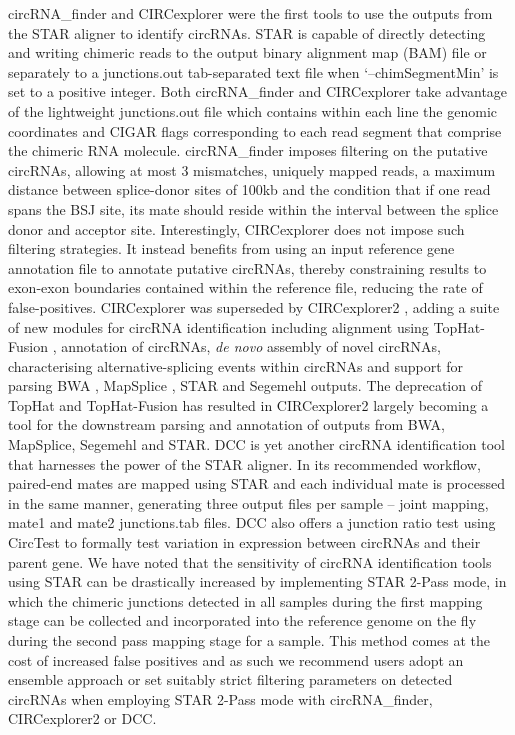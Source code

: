 \documentclass[pdflatex,sn-mathphys-num]{sn-jnl}
\begin{document}
circRNA\_finder \cite{circRNA_finder} and CIRCexplorer \cite{CIRCexplorer} were the first tools to use the outputs from the STAR aligner to identify circRNAs. STAR is capable of directly detecting and writing chimeric reads to the output binary alignment map (BAM) file or separately to a junctions.out tab-separated text file when `--chimSegmentMin' is set to a positive integer. Both circRNA\_finder and CIRCexplorer take advantage of the lightweight junctions.out file which contains within each line the genomic coordinates and CIGAR flags corresponding to each read segment that comprise the chimeric RNA molecule. circRNA\_finder imposes filtering on the putative circRNAs, allowing at most 3 mismatches, uniquely mapped reads, a maximum distance between splice-donor sites of 100kb and the condition that if one read spans the BSJ site, its mate should reside within the interval between the splice donor and acceptor site. Interestingly, CIRCexplorer does not impose such filtering strategies. It instead benefits from using an input reference gene annotation file to annotate putative circRNAs, thereby constraining results to exon-exon boundaries contained within the reference file, reducing the rate of false-positives. CIRCexplorer was superseded by CIRCexplorer2 \cite{CIRCexplorer2}, adding a suite of new modules for circRNA identification including alignment using TopHat-Fusion \cite{TopHatFusion}, annotation of circRNAs, \textit{de novo} assembly of novel circRNAs, characterising alternative-splicing events within circRNAs and support for parsing BWA \cite{BWA}, MapSplice \cite{MapSplice}, STAR \cite{STAR} and Segemehl \cite{segemehl} outputs. The deprecation of TopHat and TopHat-Fusion has resulted in CIRCexplorer2 largely becoming a tool for the downstream parsing and annotation of outputs from BWA, MapSplice, Segemehl and STAR. DCC \cite{DCC} is yet another circRNA identification tool that harnesses the power of the STAR aligner. In its recommended workflow, paired-end mates are mapped using STAR and each individual mate is processed in the same manner, generating three output files per sample -- joint mapping, mate1 and mate2 junctions.tab files. DCC also offers a junction ratio test using CircTest to formally test variation in expression between circRNAs and their parent gene. We have noted that the sensitivity of circRNA identification tools using STAR can be drastically increased by implementing STAR 2-Pass mode, in which the chimeric junctions detected in all samples during the first mapping stage can be collected and incorporated into the reference genome on the fly during the second pass mapping stage for a sample. This method comes at the cost of increased false positives \cite{Engstrom2013Dec} and as such we recommend users adopt an ensemble approach or set suitably strict filtering parameters on detected circRNAs when employing STAR 2-Pass mode with circRNA\_finder, CIRCexplorer2 or DCC. \par
\end{document}

